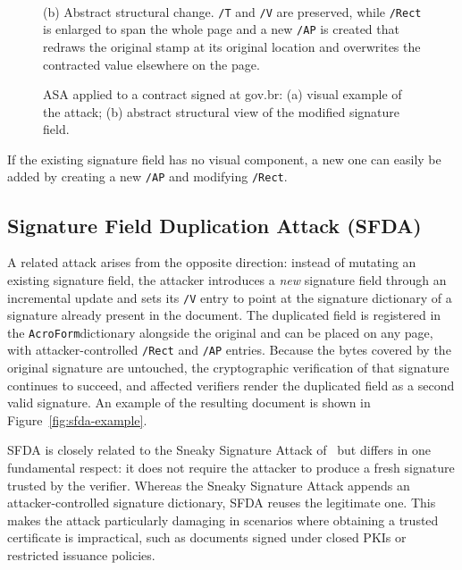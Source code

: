 \documentclass[12pt]{article}
\begin{document}
\begin{figure}[H]
\begin{minipage}{\linewidth}
\\[3pt]
		{\footnotesize (b) Abstract structural change. \texttt{/T} and \texttt{/V} are preserved, while \texttt{/Rect} is enlarged to span the whole page and a new \texttt{/AP} is created that redraws the original stamp at its original location and overwrites the contracted value elsewhere on the page.}
	\end{minipage}
	\caption{ASA applied to a contract signed at gov.br: (a) visual example of the attack; (b) abstract structural view of the modified signature field.\label{fig:rect-ap-abuse}}
\end{figure}


If the existing signature field has no visual component, a new one can easily be added by creating a new \texttt{/AP} and modifying \texttt{/Rect}.

\subsection{Signature Field Duplication Attack (SFDA)}

A related attack arises from the opposite direction: instead of mutating an existing signature field, the attacker introduces a \emph{new} signature field through an incremental update and sets its \texttt{/V} entry to point at the signature dictionary of a signature already present in the document. The duplicated field is registered in the \texttt{AcroForm}dictionary alongside the original and can be placed on any page, with attacker-controlled \texttt{/Rect} and \texttt{/AP} entries. Because the bytes covered by the original signature are untouched, the cryptographic verification of that signature continues to succeed, and affected verifiers render the duplicated field as a second valid signature. An example of the resulting document is shown in Figure~\ref{fig:sfda-example}.

SFDA is closely related to the Sneaky Signature Attack of~\cite{pdf-certification-attack} but differs in one fundamental respect: it does not require the attacker to produce a fresh signature trusted by the verifier. Whereas the Sneaky Signature Attack appends an attacker-controlled signature dictionary, SFDA reuses the legitimate one. This makes the attack particularly damaging in scenarios where obtaining a trusted certificate is impractical, such as documents signed under closed PKIs or restricted issuance policies.
\end{document}
